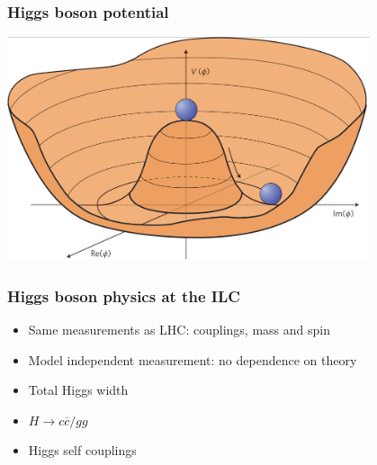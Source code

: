 \documentclass{beamer}
\begin{document}
  \begin{frame}[plain]
    \frametitle{Higgs boson potential}

    \begin{center}
      \includegraphics[width = 0.8\textwidth]{Pictures/higgsPotential.png}
    \end{center}
  \end{frame}

  \begin{frame}[plain]
    \frametitle{Higgs boson physics at the ILC}

    \begin{itemize}
      \item Same measurements as LHC: couplings, mass and spin
      \item Model independent measurement: no dependence on theory
      \item Total Higgs width
      \item $H \rightarrow c\overline{c}/gg$
      \item Higgs self couplings
    \end{itemize}
  \end{frame}
\end{document}
